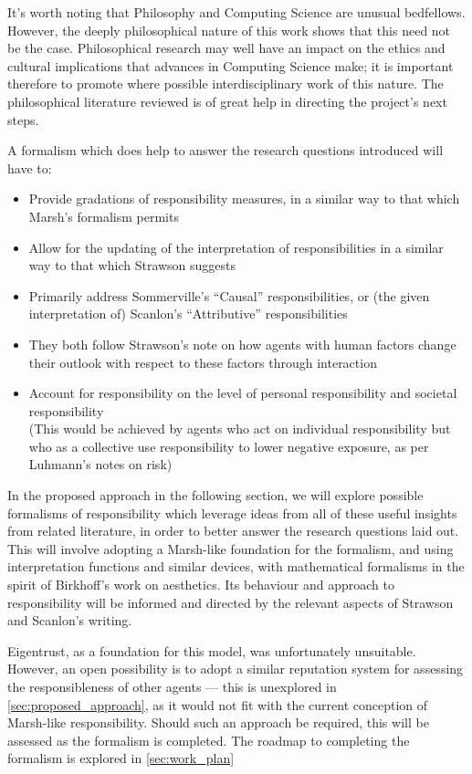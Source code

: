 It's worth noting that Philosophy and Computing Science are unusual bedfellows. However, the deeply philosophical nature of this work shows that this need not be the case. Philosophical research may well have an impact on the ethics and cultural implications that advances in Computing Science make; it is important therefore to promote where possible interdisciplinary work of this nature. The philosophical literature reviewed is of great help in directing the project's next steps.\par

A formalism which does help to answer the research questions introduced will have to:

\begin{itemize}
    \item Provide gradations of responsibility measures, in a similar way to that which Marsh's formalism permits
    \item Allow for the updating of the interpretation of responsibilities in a similar way to that which Strawson suggests
    \item Primarily address Sommerville's ``Causal'' responsibilities, or (the given interpretation of) Scanlon's ``Attributive'' responsibilities
    \item They both follow Strawson's note on how agents with human factors change their outlook with respect to these factors through interaction
    \item Account for responsibility on the level of personal responsibility and societal responsibility\\
        (This would be achieved by agents who act on individual responsibility but who as a collective use responsibility to lower negative exposure, as per Luhmann's notes on risk)
\end{itemize}

In the proposed approach in the following section, we will explore possible formalisms of responsibility which leverage ideas from all of these useful insights from related literature, in order to better answer the research questions laid out. This will involve adopting a Marsh-like foundation for the formalism, and using interpretation functions and similar devices, with mathematical formalisms in the spirit of Birkhoff's work on aesthetics. Its behaviour and approach to responsibility will be informed and directed by the relevant aspects of Strawson and Scanlon's writing.\par

Eigentrust, as a foundation for this model, was unfortunately unsuitable. However, an open possibility is to adopt a similar reputation system for assessing the responsibleness of other agents --- this is unexplored in \cref{sec:proposed_approach}, as it would not fit with the current conception of Marsh-like responsibility. Should such an approach be required, this will be assessed as the formalism is completed. The roadmap to completing the formalism is explored in \cref{sec:work_plan}

